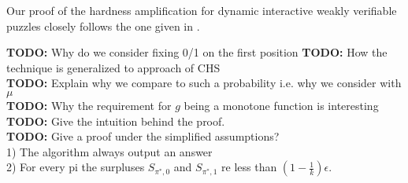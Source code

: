 Our proof of the hardness amplification for dynamic interactive weakly verifiable puzzles closely follows the one given in \cite{DBLP:journals/corr/abs-1002-3534}.
\begin{todo}
  \textbf{TODO:} Why do we consider fixing 0/1 on the first position
  \textbf{TODO:} How the technique is generalized to approach of CHS \\
  \textbf{TODO:} Explain why we compare to such a probability i.e. why we consider with $\mu$ \\
  \textbf{TODO:} Why the requirement for $g$ being a monotone function is interesting \\
  \textbf{TODO:} Give the intuition behind the proof. \\
  \textbf{TODO:} Give a proof under the simplified assumptions? \\
  1) The algorithm always output an answer \\
  2) For every pi the surpluses $S_{\pi^*, 0}$ and $S_{\pi^*, 1}$ re less than $(1-\frac{1}{k})\epsilon$.\\
\end{todo}


